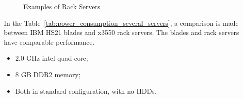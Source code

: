             \begin{figure}[h!tb]
                \centering
                \caption{Examples of Rack Servers}
                \label{fig:example_rack_server}
            \end{figure}
            In the Table~\ref{tab:power_consumption_several_servers}, a comparison is made between IBM HS21 blades and x3550 rack servers. The blades and rack servers have comparable performance.
            \begin{itemize}
                \item 2.0 GHz intel quad core;
                \item 8 GB DDR2 memory;
                \item Both in standard configuration, with no HDDs.
            \end{itemize}
